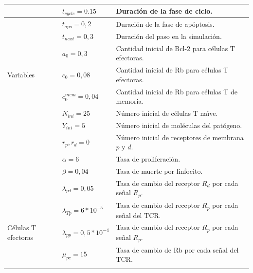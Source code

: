 \begin{table}[h]
	\begin{center}
		\begin{tabular}{>{\centering\arraybackslash}m{2cm} >{\arraybackslash}m{3cm} >{\arraybackslash}m{7cm} }%
			\hline
			\multirow{9}{*}{} & $t_{cycle} = 0.15$               & Duración de la fase de ciclo.                             \\ \cline{2-3}
			& $t_{apo} = 0,2$                  & Duración de la fase de apóptosis.                         \\ \cline{2-3}
			& $t_{next} = 0,3$                 & Duración del paso en la simulación.                       \\ \cline{2-3}
			& $a_0 = 0,3$                      & Cantidad inicial de Bcl-2 para células T efectoras.       \\ \cline{2-3}
			Variables         & $c_0 = 0,08$                     & Cantidad inicial de Rb para células T efectoras.          \\ \cline{2-3}
			& $c_0^{mem} = 0,04$               & Cantidad inicial de Rb para células T de memoria.         \\ \cline{2-3}
			& $N_{ini} = 25$                   & Número inicial de células T naïve.                        \\ \cline{2-3}
			& $Y_{ini} = 5$                    & Número inicial de moléculas del patógeno.                 \\ \cline{2-3}
			& $r_p, r_d = 0$                   & Número inicial de receptores de membrana $p$ y $d$.       \\ \hline
			\multirow{2}{*}{Patógeno}  & $\alpha = 6$                    & Tasa de proliferación.                                    \\ \cline{2-3}
			& $\beta = 0,04$                    & Tasa de muerte por linfocito.                             \\ \hline
			\multirow{5}{*}{} & $\lambda_{pd} = 0,05$            & Tasa de cambio del receptor $R_d$ por cada señal $R_p$.   \\ \cline{2-3}
			& $\lambda_{Tp} = 6*10^{-5}$       & Tasa de cambio del receptor $R_p$ por cada señal del TCR. \\ \cline{2-3}
			Células T  efectoras       & $\lambda_{pp} = 0,5*10^{-4}$     & Tasa de cambio del receptor $R_p$ por cada señal $R_p$.   \\ \cline{2-3}
			& $\mu_{pc} = 15$                 & Tasa de cambio de Rb por cada señal del TCR.              \\ \cline{2-3}

\end{tabular}
\end{center}
\end{table}
